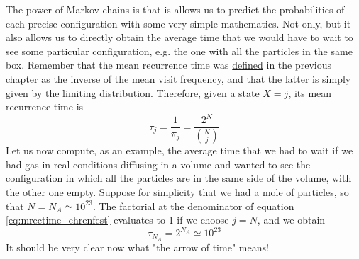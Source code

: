 The power of Markov chains is that is allows us to predict the probabilities of each precise configuration with some very simple mathematics. Not only, but it also allows us to directly obtain the average time that we would have to wait to see some particular configuration, e.g. the one with all the particles in the same box. Remember that the mean recurrence time was \hyperref[def:mean_rec_time] {defined} in the previous chapter as the inverse of the mean visit frequency, and that the latter is simply given by the limiting distribution. Therefore, given a state $X = j$, its mean recurrence time is 
\begin{equation} \label{eq:mrectime_ehrenfest}
    \tau_j = \frac{1}{\pi_j} = \frac{2^N}{{{N} \choose {j}}} 
\end{equation}
Let us now compute, as an example, the average time that we had to wait if we had gas in real conditions diffusing in a volume and wanted to see the configuration in which all the particles are in the same side of the volume, with the other one empty. Suppose for simplicity that we had a mole of particles, so that $N = N_A \simeq 10^{23}$. The factorial at the denominator of equation \ref{eq:mrectime_ehrenfest} evaluates to 1 if we choose $j = N$, and we obtain
\begin{equation}
    \tau_{N_A} = 2^{N_A} \simeq 10^{23}
\end{equation}
It should be very clear now what "the arrow of time" means!